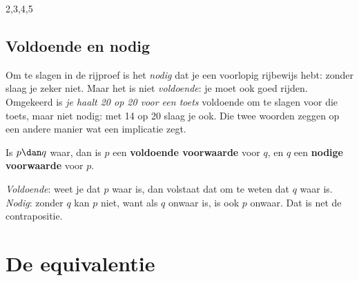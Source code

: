 \begin{alleenvoor}{2,3,4,5}
\subsection{Voldoende en nodig}

Om te slagen in de rijproef is het \textit{nodig} dat je een voorlopig rijbewijs hebt: zonder slaag je zeker niet. Maar het is niet \textit{voldoende}: je moet ook goed rijden. Omgekeerd is \textit{je haalt 20 op 20 voor een toets} voldoende om te slagen voor die toets, maar niet nodig: met 14 op 20 slaag je ook. Die twee woorden zeggen op een andere manier wat een implicatie zegt.

\begin{theorie}
Is $p \dan q$ waar, dan is $p$ een \textbf{\textcolor{accent}{voldoende voorwaarde}} voor $q$, en $q$ een \textbf{\textcolor{accent}{nodige voorwaarde}} voor $p$.
\end{theorie}

\textit{Voldoende}: weet je dat $p$ waar is, dan volstaat dat om te weten dat $q$ waar is. \textit{Nodig}: zonder $q$ kan $p$ niet, want als $q$ onwaar is, is ook $p$ onwaar. Dat is net de contrapositie.


\begin{oefeningen}
\end{oefeningen}
\end{alleenvoor}

\section{De equivalentie}

